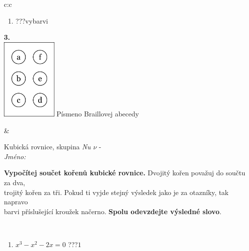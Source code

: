 \documentclass[10pt]{report}
\begin{document}
\begin{tabular}{c:c}
\begin{minipage}[c][104.5mm][t]{0.5\linewidth}
\begin{center}
\begin{minipage}{0.79\linewidth}
\begin{center}
\begin{varwidth}{\linewidth}
\begin{enumerate}
\item \quad \dotfill\; ???\;\dotfill \quad vybarvi
\end{enumerate}
\end{varwidth}
\end{center}
\end{minipage}
\begin{minipage}{0.20\linewidth}
\begin{center}
{\Huge\bfseries 3.} \\[2mm]
\includegraphics[height=40mm]{../images/braille.png}
{\small Písmeno Braillovej abecedy}
\end{center}
\end{minipage}
\end{center}
\end{minipage}
&
\begin{minipage}[c][104.5mm][t]{0.5\linewidth}
\begin{center}
\vspace{7mm}
{\huge Kubická rovnice, skupina \textit{Nu $\nu$} -}\\[5mm]
\textit{Jméno:}\phantom{xxxxxxxxxxxxxxxxxxxxxxxxxxxxxxxxxxxxxxxxxxxxxxxxxxxxxxxxxxxxxxxxx}\\[5mm]
\begin{minipage}{0.95\linewidth}
\begin{center}
\textbf{Vypočítej součet kořenů kubické rovnice.} Dvojitý kořen považuj do součtu za dva,\\trojitý kořen za tři. Pokud ti vyjde stejný výsledek jako je za otazníky, tak napravo\\barvi příslušející kroužek načerno. \textbf{Spolu odevzdejte výsledné slovo}.
\end{center}
\end{minipage}
\\[1mm]
\begin{minipage}{0.79\linewidth}
\begin{center}
\begin{varwidth}{\linewidth}
\begin{enumerate}
\Large
\item $x^3-x^2-2x=0$\quad \dotfill\; ???\;\dotfill \quad $1$

\end{enumerate}
\end{varwidth}
\end{center}
\end{minipage}
\end{center}
\end{minipage}
\end{tabular}
\end{document}
